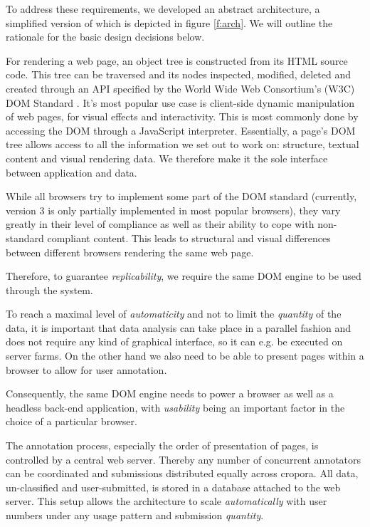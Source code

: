 To address these requirements, we developed an abstract architecture, a simplified version of which is depicted in figure \ref{f:arch}.
We will outline the rationale for the basic design decisions below.


For rendering a web page, an object tree is constructed from its HTML source code.
This tree can be traversed and its nodes inspected, modified, deleted and created through an API specified by the World Wide Web Consortium's (W3C) DOM Standard \cite{dom}.
It's most popular use case is client-side dynamic manipulation of web pages, for visual effects and interactivity.
This is most commonly done by accessing the DOM through a JavaScript interpreter.
Essentially, a page's DOM tree allows access to all the information we set out to work on: structure, textual content and visual rendering data.
We therefore make it the sole interface between application and data.

While all browsers try to implement some part of the DOM standard (currently, version 3 is only partially implemented in most popular browsers), they vary greatly in their level of compliance as well as their ability to cope with non-standard compliant content.
This leads to structural and visual differences between different browsers rendering the same web page.

Therefore, to guarantee \textit{replicability}, we require the same DOM engine to be used through the system.


To reach a maximal level of \textit{automaticity} and not to limit the \textit{quantity} of the data, it is important that data analysis can take place in a parallel fashion and does not require any kind of graphical interface, so it can e.g. be executed on server farms.
On the other hand we also need to be able to present pages within a browser to allow for user annotation.

Consequently, the same DOM engine needs to power a browser as well as a headless back-end application, with \textit{usability} being an important factor in the choice of a particular browser.


The annotation process, especially the order of presentation of pages, is controlled by a central web server.
Thereby any number of concurrent annotators can be coordinated and submissions distributed equally across cropora.
All data, un-classified and user-submitted, is stored in a database attached to the web server.
This setup allows the architecture to scale \textit{automatically} with user numbers under any usage pattern and submission \textit{quantity}.



